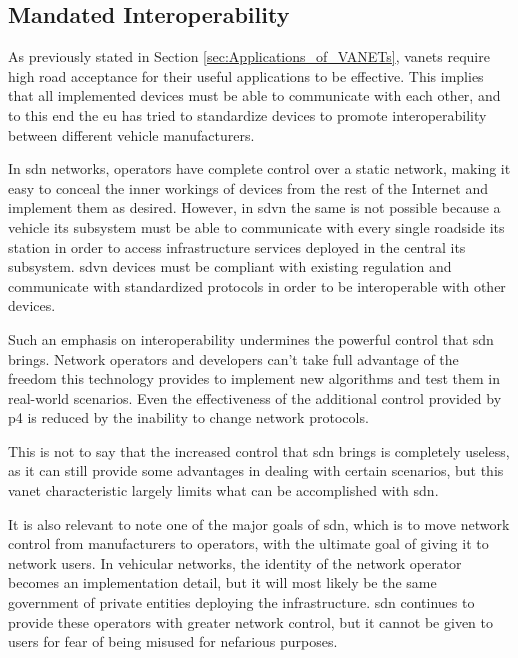 \subsection{Mandated Interoperability}
\label{subsub:mandated_interoperability}

As previously stated in Section \ref{sec:Applications_of_VANETs}, \glspl{vanet} require high road acceptance for their useful applications to be effective. This implies that all implemented devices must be able to communicate with each other, and to this end the \gls{eu} has tried to standardize devices to promote interoperability between different vehicle manufacturers.

In \gls{sdn} networks, operators have complete control over a static network, making it easy to conceal the inner workings of devices from the rest of the Internet and implement them as desired. However, in \gls{sdvn} the same is not possible because a vehicle \gls{its} subsystem must be able to communicate with every single roadside \gls{its} station in order to access infrastructure services deployed in the central \gls{its} subsystem. \gls{sdvn} devices must be compliant with existing regulation and communicate with standardized protocols in order to be interoperable with other devices.

Such an emphasis on interoperability undermines the powerful control that \gls{sdn} brings. Network operators and developers can't take full advantage of the freedom this technology provides to implement new algorithms and test them in real-world scenarios. Even the effectiveness of the additional control provided by \gls{p4} is reduced by the inability to change network protocols.

This is not to say that the increased control that \gls{sdn} brings is completely useless, as it can still provide some advantages in dealing with certain scenarios, but this \gls{vanet} characteristic largely limits what can be accomplished with \gls{sdn}. 

It is also relevant to note one of the major goals of \gls{sdn}, which is to move network control from manufacturers to operators, with the ultimate goal of giving it to network users. In vehicular networks, the identity of the network operator becomes an implementation detail, but it will most likely be the same government of private entities deploying the infrastructure. \gls{sdn} continues to provide these operators with greater network control, but it cannot be given to users for fear of being misused for nefarious purposes.

